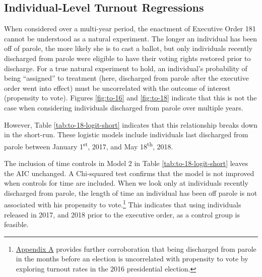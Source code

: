 \documentclass[
  12pt,
]{article}
\begin{document}
\hypertarget{individual-level-turnout-regressions}{%
\subsection*{Individual-Level Turnout Regressions}\label{individual-level-turnout-regressions}}

When considered over a multi-year period, the enactment of Executive Order 181 cannot be understood as a natural experiment. The longer an individual has been off of parole, the more likely she is to cast a ballot, but only individuals recently discharged from parole were eligible to have their voting rights restored prior to discharge. For a true natural experiment to hold, an individual's probability of being ``assigned'' to treatment (here, discharged from parole after the executive order went into effect) must be uncorrelated with the outcome of interest (propensity to vote). Figures \ref{fig:to-16} and \ref{fig:to-18} indicate that this is not the case when considering individuals discharged from parole over multiple years.

However, Table \ref{tab:to-18-logit-short} indicates that this relationship breaks down in the short-run. These logistic models include individuals last discharged from parole between January 1\textsuperscript{st}, 2017, and May 18\textsuperscript{th}, 2018.

\begin{singlespace}


\end{singlespace}

The inclusion of time controls in Model 2 in Table \ref{tab:to-18-logit-short} leaves the AIC unchanged. A Chi-squared test confirms that the model is not improved when controls for time are included. When we look only at individuals recently discharged from parole, the length of time an individual has been off parole is not associated with his propensity to vote.\footnote{\protect\hyperlink{appendix-a}{Appendix A} provides further corroboration that being discharged from parole in the months before an election is uncorrelated with propensity to vote by exploring turnout rates in the 2016 presidential election.} This indicates that using individuals released in 2017, and 2018 prior to the executive order, as a control group is feasible.
\end{document}
